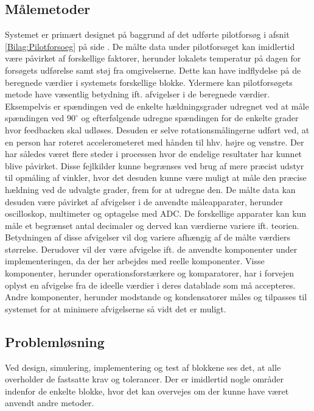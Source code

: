 \subsection{Målemetoder}
Systemet er primært designet på baggrund af det udførte pilotforsøg i afsnit \ref{Bilag:Pilotforsoeg} på side \pageref{Bilag:Pilotforsoeg}. De målte data under pilotforsøget kan imidlertid være påvirket af forskellige faktorer, herunder lokalets temperatur på dagen for forsøgets udførelse samt støj fra omgivelserne. Dette kan have indflydelse på de beregnede værdier i systemets forskellige blokke.
Ydermere kan pilotforsøgets metode have væsentlig betydning ift. afvigelser i de beregnede værdier. Eksempelvis er spændingen ved de enkelte hældningsgrader udregnet ved at måle spændingen ved $90^{\circ}$ og efterfølgende udregne spændingen for de enkelte grader hvor feedbacken skal udløses. Desuden er selve rotationsmålingerne udført ved, at en person har roteret accelerometeret med hånden til hhv. højre og venstre. Der har således været flere steder i processen hvor de endelige resultater har kunnet blive påvirket. Disse fejlkilder kunne begrænses ved brug af mere præcist udstyr til opmåling af vinkler, hvor det desuden kunne være muligt at måle den præcise hældning ved de udvalgte grader, frem for at udregne den.  
De målte data kan desuden være påvirket af afvigelser i de anvendte måleapparater, herunder oscilloskop, multimeter og optagelse med ADC. De forskellige apparater kan kun måle et begrænset antal decimaler og derved kan værdierne variere ift. teorien. Betydningen af disse afvigelser vil dog variere afhængig af de målte værdiers størrelse. Derudover vil der være afvigelse ift. de anvendte komponenter under implementeringen, da der her arbejdes med reelle komponenter. Visse komponenter, herunder operationsforstærkere og komparatorer, har i forvejen oplyst en afvigelse fra de ideelle værdier i deres datablade som må accepteres. Andre komponenter, herunder modstande og kondensatorer måles og tilpasses til systemet for at minimere afvigelserne så vidt det er muligt. 

\subsection{Problemløsning}
Ved design, simulering, implementering og test af blokkene ses det, at alle overholder de fastsatte krav og tolerancer. Der er imidlertid nogle områder indenfor de enkelte blokke, hvor det kan overvejes om der kunne have været anvendt andre metoder.

